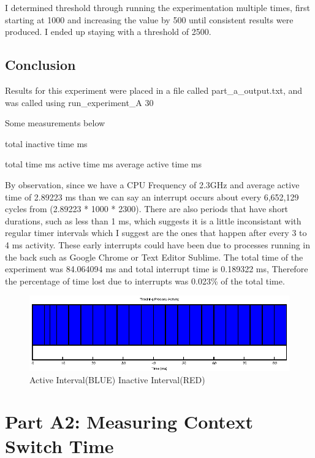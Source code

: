 \documentclass{article}
\begin{document}
I determined threshold through running the experimentation multiple times, first starting at 1000 and increasing the value by 500 until consistent results were produced. I ended up  staying with a threshold of 2500.

\subsection{Conclusion}

Results for this experiment were placed in a file called part\_a\_output.txt, and was called using run\_experiment\_A 30

Some measurements below

total inactive time  ms 

total time  ms
active time  ms
average active time  ms

By observation, since we have a CPU Frequency of 2.3GHz and average active time of 2.89223 ms than we can say an interrupt occurs about every 6,652,129 cycles from (2.89223 * 1000 * 2300). There are also periods that have short durations, such as less than 1 ms, which suggests it is a little inconsistant with regular timer intervals which I suggest are the ones that happen after every 3 to 4 ms activity. These early interrupts could have been due to processes running in the back such as Google Chrome or Text Editor Sublime.
The total time of the experiment was 84.064094 ms and total interrupt time is 0.189322 ms, Therefore the percentage of time lost due to interrupts was 0.023\% of the total time.

\begin{figure}
\centering
\includegraphics[scale=1.25]{part_a.eps}
\caption{Active \- Interval(BLUE) Inactive \- Interval(RED)}
\label{fig:parta}
\end{figure}

\section{Part A2: Measuring Context Switch Time}
\end{document}
